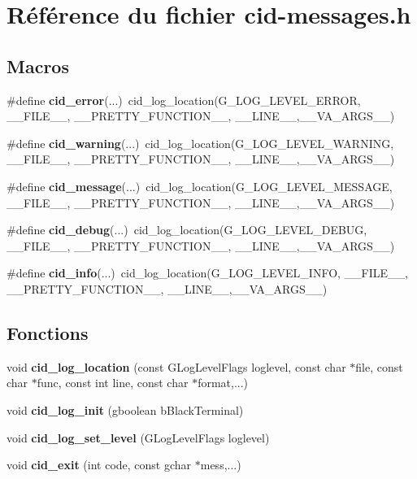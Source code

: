 \section{Référence du fichier cid-messages.h}
\label{cid-messages_8h}
\subsection*{Macros}
\begin{CompactItemize}
\item 
\#define {\bf cid\_\-error}(...)~cid\_\-log\_\-location(G\_\-LOG\_\-LEVEL\_\-ERROR, \_\-\_\-FILE\_\-\_\-, \_\-\_\-PRETTY\_\-FUNCTION\_\-\_\-, \_\-\_\-LINE\_\-\_\-,\_\-\_\-VA\_\-ARGS\_\-\_\-)
\item 
\#define {\bf cid\_\-warning}(...)~cid\_\-log\_\-location(G\_\-LOG\_\-LEVEL\_\-WARNING, \_\-\_\-FILE\_\-\_\-, \_\-\_\-PRETTY\_\-FUNCTION\_\-\_\-, \_\-\_\-LINE\_\-\_\-,\_\-\_\-VA\_\-ARGS\_\-\_\-)
\item 
\#define {\bf cid\_\-message}(...)~cid\_\-log\_\-location(G\_\-LOG\_\-LEVEL\_\-MESSAGE, \_\-\_\-FILE\_\-\_\-, \_\-\_\-PRETTY\_\-FUNCTION\_\-\_\-, \_\-\_\-LINE\_\-\_\-,\_\-\_\-VA\_\-ARGS\_\-\_\-)
\item 
\#define {\bf cid\_\-debug}(...)~cid\_\-log\_\-location(G\_\-LOG\_\-LEVEL\_\-DEBUG, \_\-\_\-FILE\_\-\_\-, \_\-\_\-PRETTY\_\-FUNCTION\_\-\_\-, \_\-\_\-LINE\_\-\_\-,\_\-\_\-VA\_\-ARGS\_\-\_\-)
\item 
\#define {\bf cid\_\-info}(...)~cid\_\-log\_\-location(G\_\-LOG\_\-LEVEL\_\-INFO, \_\-\_\-FILE\_\-\_\-, \_\-\_\-PRETTY\_\-FUNCTION\_\-\_\-, \_\-\_\-LINE\_\-\_\-,\_\-\_\-VA\_\-ARGS\_\-\_\-)
\end{CompactItemize}
\subsection*{Fonctions}
\begin{CompactItemize}
\item 
void {\bf cid\_\-log\_\-location} (const GLogLevelFlags loglevel, const char $\ast$file, const char $\ast$func, const int line, const char $\ast$format,...)
\item 
void {\bf cid\_\-log\_\-init} (gboolean bBlackTerminal)
\item 
void {\bf cid\_\-log\_\-set\_\-level} (GLogLevelFlags loglevel)
\item 
void {\bf cid\_\-exit} (int code, const gchar $\ast$mess,...)
\end{CompactItemize}
